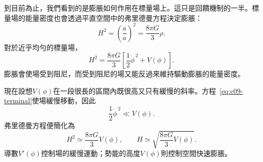 到目前為止，我們看到的是膨脹如何作用在標量場上。這只是回饋機制的一半。標量場的能量密度也會透過平直空間中的弗里德曼方程決定膨脹：
\begin{equation}
H^2=\left(\frac{\dot a}{a}\right)^2
=\frac{8\pi G}{3}\rho.
\label{eq:c09-friedmann}
\end{equation}
對於近乎均勻的標量場，
\begin{equation}
H^2
=\frac{8\pi G}{3}
\left[
\frac12\dot\phi^{\,2}+V(\phi)
\right].
\label{eq:c09-friedmann-scalar}
\end{equation}
膨脹會使場受到阻尼，而受到阻尼的場又能反過來維持驅動膨脹的能量密度。

\begin{classroomqa}
\end{classroomqa}

\begin{classroomqa}
\end{classroomqa}

\begin{classroomqa}
\end{classroomqa}

\begin{classroomqa}
\end{classroomqa}

現在設想\(V(\phi)\)在一段很長的區間內既很高又只有緩慢的斜率。方程~\eqref{eq:c09-terminal}使場緩慢移動，因此
\begin{equation}
\frac12\dot\phi^{\,2}\ll V(\phi).
\end{equation}
弗里德曼方程便簡化為
\begin{equation}
H^2\simeq\frac{8\pi G}{3}V(\phi),
\qquad
H\simeq
\sqrt{\frac{8\pi G}{3}V(\phi)}.
\label{eq:c09-potential-dominated}
\end{equation}
導數\(V'(\phi)\)控制場的緩慢運動；勢能的高度\(V(\phi)\)則控制空間快速膨脹。

